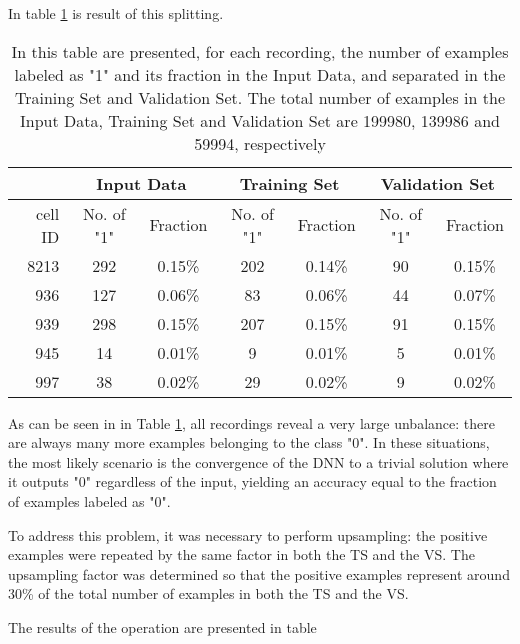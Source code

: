 In table \ref{table:summary-beforeUS} is result of this splitting.
\begin{table}[htbp]
\begin{center}
\begin{tabular}{r|cc|cc|cc}
\multicolumn{1}{l|}{} & \multicolumn{ 2}{c|}{Input Data} & \multicolumn{ 2}{c|}{Training Set} & \multicolumn{ 2}{c}{Validation Set} \\ \hline
cell ID & No. of "1"  & Fraction & No. of "1"  & Fraction & No. of "1" & Fraction \\ \hline
8213 & 292 & 0.15\% & 202 & 0.14\% & 90 & 0.15\% \\ 
936 & 127 & 0.06\% & 83 & 0.06\% & 44 & 0.07\% \\ 
939 & 298 & 0.15\% & 207 & 0.15\% & 91 & 0.15\% \\ 
945 & 14 & 0.01\% & 9 & 0.01\% & 5 & 0.01\% \\ 
997 & 38 & 0.02\% & 29 & 0.02\% & 9 & 0.02\% \\ 
\end{tabular}
\end{center}
\caption{In this table are presented, for each recording, the number of examples labeled as "1" and its fraction in the Input Data, and separated in the Training Set and Validation Set. The total number of examples in the Input Data, Training Set and Validation Set are 199980, 139986 and 59994, respectively}
\label{table:summary-beforeUS}
\end{table}

As can be seen in in Table \ref{table:summary-beforeUS}, all recordings reveal a very large unbalance: there are always many more examples belonging to the class "0". In these situations, the most likely scenario is the convergence of the DNN to a trivial solution where it outputs "0" regardless of the input, yielding an accuracy equal to the fraction of examples labeled as "0".

To address this problem, it was necessary to perform upsampling: the positive examples were repeated by the same factor in both the TS and the VS. The upsampling factor was determined so that the positive examples represent around 30\% of the total number of examples in both the TS and the VS.

The results of the operation are presented in table 

